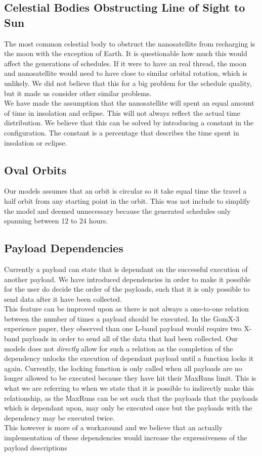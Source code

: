 \subsection{Celestial Bodies Obstructing Line of Sight to Sun}
The most common celestial body to obstruct the nanosatellite from recharging is the moon with the exception of Earth.
It is questionable how much this would affect the generations of schedules. If it were to have an real thread, the moon and nanosatellite would need to have close to similar orbital rotation, which is unlikely. We did not believe that this for a big problem for the schedule quality, but it made us consider other similar problems.\\
We have made the assumption that the nanosatellite will spent an equal amount of time in insolation and eclipse. This will not always reflect the actual time distribution. We believe that this can be solved by introducing a constant in the configuration. The constant is a percentage that describes the time spent in insolation or eclipse. 

\subsection{Oval Orbits}
Our models assumes that an orbit is circular so it take equal time the travel a half orbit from any starting point in the orbit. This was not include to simplify the model and deemed unnecessary because the generated schedules only spanning between 12 to 24 hours. 

\subsection{Payload Dependencies}
Currently a payload can state that is dependant on the successful execution of another payload. We have introduced dependencies in order to make it possible for the user do decide the order of the payloads, such that it is only possible to send data after it have been collected.\\
This feature can be improved upon as there is not always a one-to-one relation between the number of times a payload should be executed. In the GomX-3 experience paper\cite{gomx3}, they observed than one L-band payload would require two X-band payloads in order to send all of the data that had been collected. Our models does not \textit{directly} allow for such a relation as the completion of the dependency unlocks the execution of dependant payload until a function locks it again. Currently, the locking function is only called when all payloads are no longer allowed to be executed because they have hit their MaxRuns limit. This is what we are referring to when we state that it is possible to indirectly make this relationship, as the MaxRuns can be set such that the payloads that the payloads which is dependant upon, may only be executed once but the payloads with the dependency may be executed twice.\\
This however is more of a workaround and we believe that an actually implementation of these dependencies would increase the expressiveness of the payload descriptions

